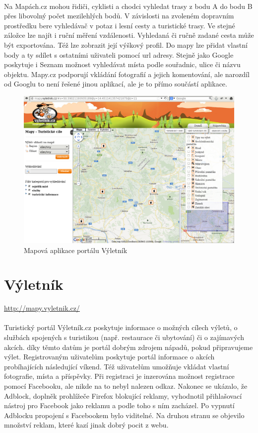 \documentclass[11pt,a4paper,titlepage,oneside]{book}
\begin{document}
		\paragraph{} Na Mapách.cz mohou řidiči, cyklisti a chodci vyhledat trasy z bodu A do bodu B přes libovolný počet mezilehlých bodů. V závislosti na zvoleném dopravním prostředku bere vyhledávač v potaz i lesní cesty a turistické trasy. Ve stejné záložce lze najít i ruční měření vzdálenosti. Vyhledaná či ručně zadané cesta může být exportována. Též lze zobrazit její výškový profil. Do mapy lze přidat vlastní body a ty sdílet s ostatními uživateli pomocí url adresy. Stejně jako Google poskytuje i Seznam možnost vyhledávat místa podle souřadnic, ulice či názvu objektu. Mapy.cz podporují vkládání fotografií a jejich komentování, ale narozdíl od Googlu to není řešené jinou aplikací, ale je to přímo součástí aplikace.

		\begin{figure}[!h]
			\begin{center}
				\includegraphics[width=12cm]{obrazky/vyletnik.png}
				\caption{Mapová aplikace portálu Výletník}
			\end{center}
		\end{figure}

	\section{Výletník}
		\label{sec:vyletnik}
		\url{http://mapy.vyletnik.cz/}
		\paragraph{} Turistický portál Výletník.cz poskytuje informace o možných cílech výletů, o službách spojených s turistikou (např. restaurace či ubytování)  či o zajímavých akcích. díky těmto datům je portál dobrým zdrojem nápadů, pokud připravujeme výlet. Registrovaným uživatelům poskytuje portál informace o akcích probíhajících následující víkend. Též uživatelům umožňuje vkládat vlastní fotografie, místa a příspěvky. Při registraci je inzerována možnost registrace pomocí Facebooku, ale nikde na to nebyl nalezen odkaz. Nakonec se ukázalo, že Adblock, doplněk prohlížeče Firefox blokující reklamy, vyhodnotil přihlašovací nástroj pro Facebook jako reklamu a podle toho s ním zacházel. Po vypnutí Adblocku propojení s Facebookem bylo viditelné. Na druhou stranu se objevilo množství reklam, které kazí jinak dobrý pocit z webu.
\end{document}

